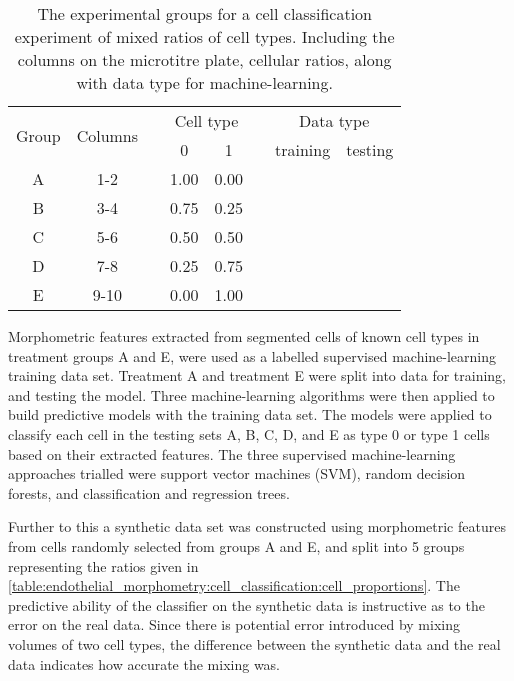 \begin{table}[htbp!]
\centering
\caption[Cell classification mixed ratio groups]{The experimental groups for a cell classification experiment of mixed ratios of cell types. Including the columns on the microtitre plate, cellular ratios, along with data type for machine-learning.}
\label{table:endothelial_morphometry:cell_classification:cell_proportions}
\begin{tabular}{c c c c c c c c}
\toprule
\multirow{2}{*}{Group} & \multirow{2}{*}{Columns} & & \multicolumn{2}{c}{Cell type} & & \multicolumn{2}{c}{Data type} \\
\cmidrule{4-5}
\cmidrule{7-8}
	& & & 0 & 1 & & training & testing \\
\midrule
	A & 1-2  & & 1.00 & 0.00 & & \cmark & \cmark \\
	B & 3-4  & & 0.75 & 0.25 & & \xmark & \cmark \\
	C & 5-6  & & 0.50 & 0.50 & & \xmark & \cmark \\
	D & 7-8  & & 0.25 & 0.75 & & \xmark & \cmark \\
	E & 9-10 & & 0.00 & 1.00 & & \cmark & \cmark \\
\bottomrule
\end{tabular}
\end{table}

Morphometric features extracted from segmented cells of known cell types in treatment groups A and E, were used as a labelled supervised machine-learning training data set. Treatment A and treatment E were split into data for training, and testing the model. Three machine-learning algorithms were then applied to build predictive models with the training data set. The models were applied to classify each cell in the testing sets A, B, C, D, and E as type 0 or type 1 cells based on their extracted features. The three supervised machine-learning approaches trialled were support vector machines (SVM), random decision forests, and classification and regression trees.

Further to this a synthetic data set was constructed using morphometric features from cells randomly selected from groups A and E, and split into 5 groups representing the ratios given in \autoref{table:endothelial_morphometry:cell_classification:cell_proportions}. The predictive ability of the classifier on the synthetic data is instructive as to the error on the real data. Since there is potential error introduced by mixing volumes of two cell types, the difference between the synthetic data and the real data indicates how accurate the mixing was.


